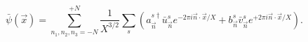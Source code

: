 \begin{equation}
\label{fieldbar}
\bar{\psi}({\vec x}) = \sum_{n_1,n_2,n_3=-N}^{+N} \frac{1}{X^{3/2}} \sum_s
\left(a^{s\dagger}_{\vec n} \bar{u}^s_{\vec n} e^{-2\pi i{\vec 
n}\cdot{\vec x}/X} + b^{s}_{\vec n} \bar{v}^s_{\vec n} e^{+2\pi i {\vec 
n}\cdot{\vec x}/X}\right).
\end{equation}

